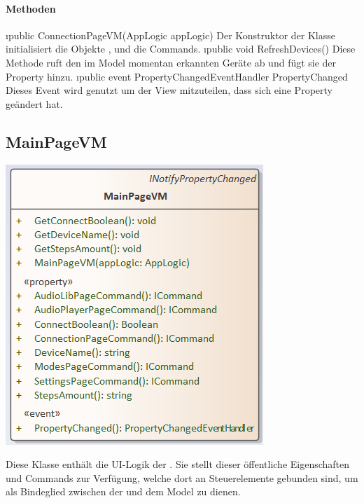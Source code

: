 \documentclass[../entwurf.tex]{subfiles}
\begin{document}
\paragraph{Methoden}
\begin{itemize}
	\i{public ConnectionPageVM(AppLogic appLogic)} Der Konstruktor der Klasse initialisiert die Objekte ,  und die Commands.
	\i{public void RefreshDevices()} Diese Methode ruft den im Model momentan erkannten Geräte ab und fügt sie der Property  hinzu.
	\i{public event PropertyChangedEventHandler PropertyChanged} Dieses Event wird genutzt um der View mitzuteilen, dass sich eine Property geändert hat.
\end{itemize}
\subsection{MainPageVM}
\begin{minipage}{0.55\textwidth}
\includegraphics[scale=0.75]{../graphics/vm_klassen/MainPageVM.png}
\end{minipage}
\begin{minipage}{0.45\textwidth}
Diese Klasse enthält die UI-Logik der . Sie stellt dieser öffentliche Eigenschaften und Commands zur Verfügung, welche dort an Steuerelemente gebunden sind, um als Bindeglied zwischen der  und dem Model zu dienen.
\end{minipage}
\end{document}
